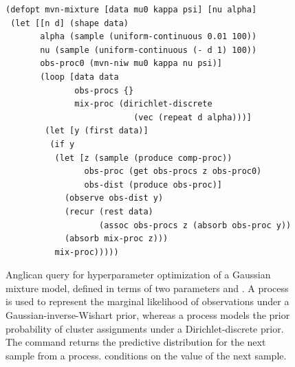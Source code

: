 

\begin{figure}[t]
	\begin{lstlisting}[basicstyle=\footnotesize\ttfamily]
(defopt mvn-mixture [data mu0 kappa psi] [nu alpha]
 (let [[n d] (shape data)
       alpha (sample (uniform-continuous 0.01 100))
       nu (sample (uniform-continuous (- d 1) 100))
       obs-proc0 (mvn-niw mu0 kappa nu psi)]
       (loop [data data
              obs-procs {}
              mix-proc (dirichlet-discrete 
                          (vec (repeat d alpha)))]
	    (let [y (first data)]
	     (if y
	      (let [z (sample (produce comp-proc))
	            obs-proc (get obs-procs z obs-proc0)
	            obs-dist (produce obs-proc)]
	        (observe obs-dist y)
	        (recur (rest data)
	               (assoc obs-procs z (absorb obs-proc y))
	        (absorb mix-proc z)))
	      mix-proc)))))
	\end{lstlisting}
	\caption{
		\label{fig:mvn-code}
		Anglican query for hyperparameter optimization of a Gaussian mixture model, defined in terms of two parameters  and . A  process is used to represent the marginal likelihood of observations under a Gaussian-inverse-Wishart prior, whereas a  process models the prior probability of cluster assignments under a Dirichlet-discrete prior. The command  returns the predictive distribution for the next sample from a process.  conditions on the value of the next sample.}
\end{figure}

